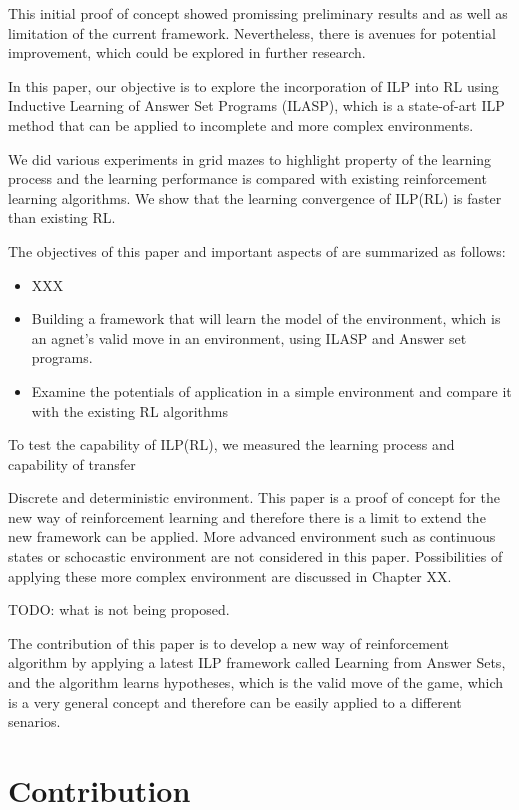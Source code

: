This initial proof of concept showed promissing preliminary results and as well as limitation of the current framework. 
Nevertheless, there is avenues for potential improvement, which could be explored in further research.

In this paper, our objective is to  explore the incorporation of ILP into RL using Inductive Learning of Answer Set Programs (ILASP), which is a state-of-art ILP method that can be applied to incomplete and more complex environments.

We did various experiments in grid mazes to highlight property of the learning process and the learning performance is compared with existing reinforcement learning algorithms.
We show that the learning convergence of ILP(RL) is faster than existing RL. 

The objectives of this paper and important aspects of are summarized as follows:


\begin{itemize}
    \item XXX
    \item Building a framework that will learn the model of the environment, which is an agnet's valid move in an environment, using ILASP and Answer set programs. 
    \item Examine the potentials of application in a simple environment and compare it with the existing RL algorithms 
\end{itemize}

To test the capability of ILP(RL), we measured the learning process and capability of transfer

Discrete and deterministic environment. 
This paper is a proof of concept for the new way of reinforcement learning and therefore there is a limit to extend the new framework can be applied.
More advanced environment such as continuous states or schocastic environment are not considered in this paper. Possibilities of applying these more complex environment are discussed in Chapter XX.

TODO: what is not being proposed.

The contribution of this paper is to develop a new way of reinforcement algorithm by applying a latest ILP framework called Learning from Answer Sets, 
and the algorithm learns hypotheses, which is the valid move of the game, which is a very general concept and therefore can be easily applied to a different senarios.

\section{Contribution}
\label{contribution}

